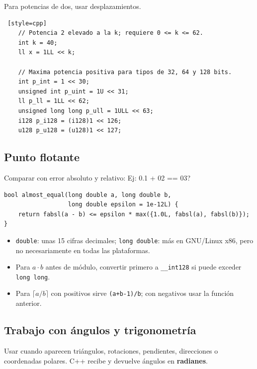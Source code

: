 Para potencias de dos, usar desplazamientos.

\begin{lstlisting} [style=cpp]
    // Potencia 2 elevado a la k; requiere 0 <= k <= 62.
    int k = 40;
    ll x = 1LL << k;

    // Maxima potencia positiva para tipos de 32, 64 y 128 bits.
    int p_int = 1 << 30;
    unsigned int p_uint = 1U << 31;
    ll p_ll = 1LL << 62;
    unsigned long long p_ull = 1ULL << 63;
    i128 p_i128 = (i128)1 << 126;
    u128 p_u128 = (u128)1 << 127;
\end{lstlisting}

\subsection{Punto flotante}

Comparar con error absoluto y relativo:
Ej: 0.1 + 02 == 03?
\begin{lstlisting}[style=cpp]
bool almost_equal(long double a, long double b,
                  long double epsilon = 1e-12L) {
    return fabsl(a - b) <= epsilon * max({1.0L, fabsl(a), fabsl(b)});
}
\end{lstlisting}

\begin{itemize}
  \item \texttt{double}: unas 15 cifras decimales; \texttt{long double}: m\'as en
  GNU/Linux x86, pero no necesariamente en todas las plataformas.
  \item Para $a\cdot b$ antes de m\'odulo, convertir primero a
  \texttt{\_\_int128} si puede exceder \texttt{long long}.
  \item Para $\lceil a/b\rceil$ con positivos sirve
  \texttt{(a+b-1)/b}; con negativos usar la funci\'on anterior.
\end{itemize}

\subsection{Trabajo con \'angulos y trigonometr\'ia}

Usar cuando aparecen tri\'angulos, rotaciones, pendientes, direcciones o
coordenadas polares. C++ recibe y devuelve \'angulos en \textbf{radianes}.

